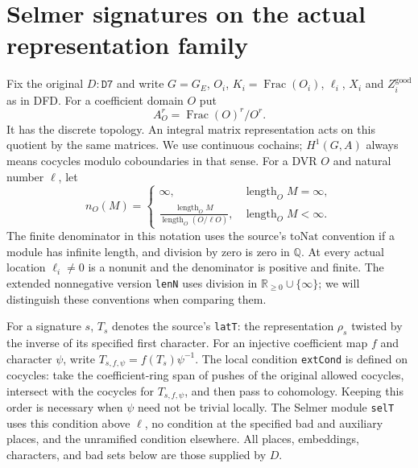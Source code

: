 \section{Selmer signatures on the actual representation family}
\label{sec:selmer-signature-v052}


Fix the original $D:\texttt{D7}$ and write $G=G_E$, $O_i$,
$K_i=\operatorname{Frac}(O_i)$, $\ell_i$, $X_i$ and
$Z_i^{\mathrm{good}}$ as in DFD. For a coefficient domain $O$ put
\[
 A_O^r=\operatorname{Frac}(O)^r/O^r.
\]
It has the discrete topology. An integral matrix representation acts
on this quotient by the same matrices. We use continuous cochains;
\(H^1(G,A)\) always means cocycles modulo coboundaries in that sense.
For a DVR $O$ and natural number $\ell$, let
\[
 n_O(M)=
 \begin{cases}
 \infty,&\operatorname{length}_O M=\infty,\\
 \displaystyle\frac{\operatorname{length}_O M}
 {\operatorname{length}_O(O/\ell O)},
       &\operatorname{length}_O M<\infty.
 \end{cases}                                                    \tag{SSC.1}
\]
The finite denominator in this notation uses the source's
\(\mathrm{toNat}\) convention if a module has infinite length, and
division by zero is zero in $\mathbb Q$. At every actual location
$\ell_i\ne0$ is a nonunit and the denominator is positive and finite.
The extended nonnegative version \texttt{lenN} uses division in
$\mathbb R_{\ge0}\cup\{\infty\}$; we will distinguish these conventions
when comparing them.

For a signature $s$, $T_s$ denotes the source's \texttt{latT}:
the representation $\rho_s$ twisted by the inverse of its specified
first character. For an injective coefficient map $f$ and character
$\psi$, write $T_{s,f,\psi}=f(T_s)\psi^{-1}$. The local condition
\texttt{extCond} is defined on cocycles: take the coefficient-ring
span of pushes of the original allowed cocycles, intersect with the
cocycles for $T_{s,f,\psi}$, and then pass to cohomology. Keeping this
order is necessary when $\psi$ need not be trivial locally.
The Selmer module \texttt{selT} uses this condition above $\ell$,
no condition at the specified bad and auxiliary places, and the
unramified condition elsewhere. All places, embeddings, characters,
and bad sets below are those supplied by $D$.

